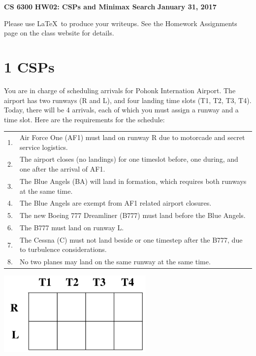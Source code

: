 \documentclass[12pt]{article}
\begin{document}
\begin{center}
{\bf CS 6300} \hfill {\large\bf HW02: CSPs and Minimax Search} \hfill {\bf January 31, 2017}
\end{center}

Please use \LaTeX\ to produce your writeups. See the Homework
Assignments page on the class website for details.

\section*{1 CSPs}

You are in charge of scheduling arrivals for Pohonk Internation
Airport.  The airport has two runways (R and L), and four landing time
slots (T1, T2, T3, T4).  Today, there will be 4 arrivals, each of
which you must assign a runway and a time slot.  Here are the
requirements for the schedule:

{\small

\begin{center}\begin{tabular}{ll}
1. & Air Force One (AF1) must land on runway R due to motorcade and secret service logistics. \\
2. & The airport closes (no landings) for one timeslot before, one during, and one after the arrival of AF1. \\
3. & The Blue Angels (BA) will land in formation, which requires both runways at the same time. \\
4. & The Blue Angels are exempt from AF1 related airport closures. \\
5. & The new Boeing 777 Dreamliner (B777) must land before the Blue Angels. \\
6. & The B777 must land on runway L. \\
7. & The Cessna (C) must not land beside or one timestep after the B777, due to turbulence considerations. \\
8. & No two planes may land on the same runway at the same time. 
\end{tabular}\end{center}

}

\begin{center}
\includegraphics[width=3in]{airport.png}
\end{center}
\end{document}
